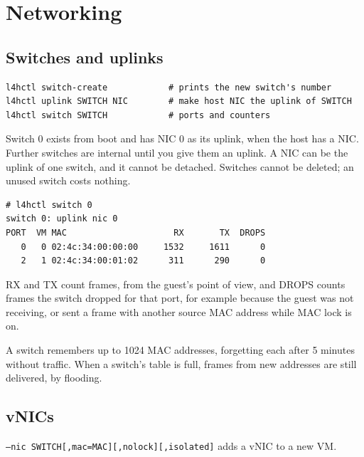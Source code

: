 \documentclass[11pt,a4paper]{report}
\begin{document}
\chapter{Networking}
\label{ch:network}

\section{Switches and uplinks}

\begin{lstlisting}
l4hctl switch-create            # prints the new switch's number
l4hctl uplink SWITCH NIC        # make host NIC the uplink of SWITCH
l4hctl switch SWITCH            # ports and counters
\end{lstlisting}

Switch 0 exists from boot and has NIC 0 as its uplink, when the host has a
NIC. Further switches are internal until you give them an uplink. A NIC can be
the uplink of one switch, and it cannot be detached. Switches cannot be
deleted; an unused switch costs nothing.

\begin{lstlisting}
# l4hctl switch 0
switch 0: uplink nic 0
PORT  VM MAC                     RX       TX  DROPS
   0   0 02:4c:34:00:00:00     1532     1611      0
   2   1 02:4c:34:00:01:02      311      290      0
\end{lstlisting}
RX and TX count frames, from the guest's point of view, and DROPS counts
frames the switch dropped for that port, for example because the guest was
not receiving, or sent a frame with another source MAC address while MAC
lock is on.

A switch remembers up to 1024 MAC addresses, forgetting each after 5
minutes without traffic. When a switch's table is full, frames from new
addresses are still delivered, by flooding.

\section{vNICs}

\texttt{--nic SWITCH[,mac=MAC][,nolock][,isolated]} adds a vNIC to a new VM.
\end{document}

